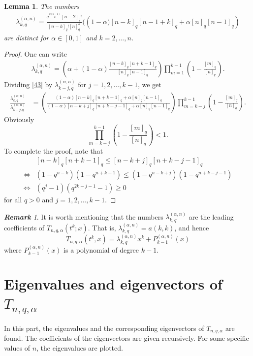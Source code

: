 \documentclass[12pt]{article}
\numberwithin{equation}{section} \theoremstyle{plain}
\newtheorem{lemma}[theorem]{Lemma}
\theoremstyle{definition}
\theoremstyle{remark}
\newtheorem{remark}{\rm\bf Remark}[section]
\begin{document}
\begin{lemma}\label{eigdifq}
The numbers 
\begin{align*}
\lambda_{k,q}^{(\alpha,n)}=\frac{q^{\frac{k(k-1)}{2}}[n-2]_q!}{[n-k]_q![n]_q^k}(\left(1-\alpha)[n-k]_q[n-1+k]_q+\alpha[n]_q[n-1]_q\right)
\end{align*}
are distinct for $\alpha\in[0,1]$ and $k=2,\ldots,n$.
\end{lemma}
\begin{proof} One can write 
\begin{eqnarray}\label{43}
\lambda_{k,q}^{(\alpha,n)}=\left(\alpha+(1-\alpha)\frac{[n-k]_q[n+k-1]_q}{[n]_q[n-1]_q}\right)\prod_{m=1}^{k-1}\left(1-\frac{[m]_q}{[n]_q}\right). 
\end{eqnarray}
Dividing \eqref{43} by $\lambda_{k-j,q}^{(\alpha,n)}$ for $j=1,2,\ldots,k-1$, we get
\begin{align*}
\frac{\lambda_{k,q}^{(\alpha,n)}}{\lambda_{k-j,q}^{(\alpha,n)}}&=\left(\frac{(1-\alpha)[n-k]_q[n+k-1]_q+\alpha[n]_q [n-1]_q}{(1-\alpha)[n-k+j]_q[n+k-j-1]_q+\alpha[n]_q [n-1]_q}\right)
\prod_{m=k-j}^{k-1}\left(1-\frac{[m]_q}{[n]_q}\right).
\end{align*}
Obviously 
$$
\prod_{m=k-j}^{k-1}\left(1-\frac{[m]_q}{[n]_q}\right)<1.
$$
To complete the proof, note that
\begin{align*}
&[n-k]_q[n+k-1]_q\leq[n-k+j]_q[n+k-j-1]_q\\
\Leftrightarrow&(1-q^{n-k})(1-q^{n+k-1})\leq(1-q^{n-k+j})(1-q^{n+k-j-1})\\
\Leftrightarrow&(q^j-1)(q^{2k-j-1}-1)\geq 0
\end{align*}
for all $q>0$ and $j=1,2,\ldots,k-1.$
\end{proof}
\begin{remark}
It is worth mentioning that the numbers $\lambda^{(\alpha,n)}_{k,q}$ are the leading coefficients of $T_{n,q,\alpha}(t^k;x).$ That is, 
 $\lambda^{(\alpha,n)}_{k,q}=a(k,k)$, and hence 
$$
T_{n,q,\alpha}(t^k,x)=\lambda^{(\alpha,n)}_{k,q}x^k+P^{(\alpha,n)}_{k-1}(x)
$$
where $P^{(\alpha,n)}_{k-1}(x)$ is a polynomial of degree $k-1.$
\end{remark}

\section{Eigenvalues and eigenvectors of $T_{n,q,\alpha}$}

In  this part, the eigenvalues and the corresponding eigenvectors of $T_{n,q,\alpha}$ are found. The coefficients of the eigenvectors are given recursively. For some specific values of $n$, the eigenvalues are plotted.
\end{document}
